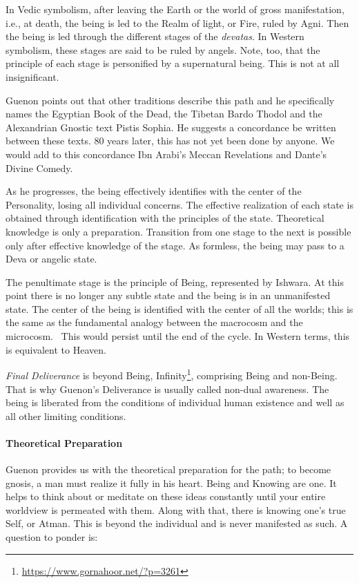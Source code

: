 In Vedic symbolism, after leaving the Earth or the world of gross manifestation, i.e., at death, the being is led to the Realm of light, or Fire, ruled by Agni. Then the being is led through the different stages of the \emph{devatas}. In Western symbolism, these stages are said to be ruled by angels. Note, too, that the principle of each stage is personified by a supernatural being. This is not at all insignificant.

Guenon points out that other traditions describe this path and he specifically names the Egyptian Book of the Dead, the Tibetan Bardo Thodol and the Alexandrian Gnostic text Pistis Sophia. He suggests a concordance be written between these texts. 80 years later, this has not yet been done by anyone. We would add to this concordance Ibn Arabi's Meccan Revelations and Dante's Divine Comedy.

As he progresses, the being effectively identifies with the center of the Personality, losing all individual concerns. The effective realization of each state is obtained through identification with the principles of the state. Theoretical knowledge is only a preparation. Transition from one stage to the next is possible only after effective knowledge of the stage. As formless, the being may pass to a Deva or angelic state.

The penultimate stage is the principle of Being, represented by Ishwara. At this point there is no longer any subtle state and the being is in an unmanifested state. The center of the being is identified with the center of all the worlds; this is the same as the fundamental analogy between the macrocosm and the microcosm.  This would persist until the end of the cycle. In Western terms, this is equivalent to Heaven.

\emph{Final Deliverance} is beyond Being, Infinity\footnote{\url{https://www.gornahoor.net/?p=3261}}, comprising Being and non-Being. That is why Guenon's Deliverance is usually called non-dual awareness. The being is liberated from the conditions of individual human existence and well as all other limiting conditions.

\paragraph{Theoretical Preparation}
Guenon provides us with the theoretical preparation for the path; to become gnosis, a man must realize it fully in his heart. Being and Knowing are one. It helps to think about or meditate on these ideas constantly until your entire worldview is permeated with them. Along with that, there is knowing one's true Self, or Atman. This is beyond the individual and is never manifested as such. A question to ponder is:

